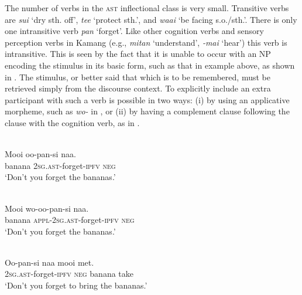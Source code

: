  



The number of verbs in the \textsc{ast} inflectional class is very small. Transitive verbs are \textit{sui} `dry sth. off', \textit{tee} `protect sth.', and \textit{waai} `be facing s.o./sth.'. There is only one intransitive verb \textit{pan} `forget'. Like other cognition verbs and sensory perception verbs in Kamang  (e.g., \textit{mitan} `understand', \textit{{}-mai} `hear') this verb is intransitive. This is seen by the fact that it is unable to occur with an NP encoding the stimulus in its basic form, such as that in example  above, as shown in . The stimulus, or better said that which is to be remembered, must be retrieved simply from the discourse context. To explicitly include an extra participant with such a verb is possible in two ways: (i) by using an applicative morpheme, such as \textit{wo-} in , or (ii) by having a complement clause following the clause with the cognition verb, as in . 


\ea%
\label{bkm:Ref372879210}
 \\ 
\gll * Mooi  oo-pan-si  naa.\\  
     {} banana  \textsc{2sg.ast}{}-forget-\textsc{ipfv} \textsc{neg}  \\
\glt  `Don't you forget the bananas.'
\z



 



\ea%
\label{bkm:Ref372879221}
 \\ 
\gll    Mooi  wo-oo-pan-si  naa.\\  
  banana  \textsc{appl-2sg.ast}{}-forget-\textsc{ipfv} \textsc{neg}  \\
\glt `Don't you forget the bananas.'
\z



  

  

\ea%
\label{bkm:Ref372879227}
 \\ 
\gll  Oo-pan-si  naa  mooi  met. \\  
    \textsc{2sg.ast}{}-forget-\textsc{ipfv} \textsc{neg}  banana  take \\
\glt  `Don't you forget to bring the bananas.'
\z

